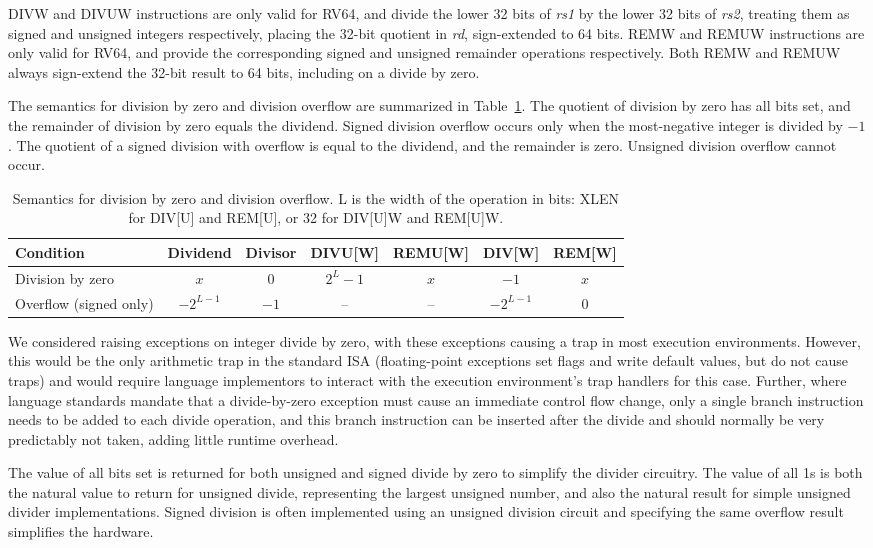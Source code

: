 DIVW and DIVUW instructions are only valid for RV64, and divide the
lower 32 bits of {\em rs1} by the lower 32 bits of {\em rs2}, treating
them as signed and unsigned integers respectively, placing the 32-bit
quotient in {\em rd}, sign-extended to 64 bits.  REMW and REMUW
instructions are only valid for RV64, and provide the corresponding
signed and unsigned remainder operations respectively. Both REMW and
REMUW always sign-extend the 32-bit result to 64 bits, including on a
divide by zero.

The semantics for division by zero and division overflow are summarized in
Table~\ref{tab:divby0}.  The quotient of division by zero has all bits set, and
the remainder of division by zero equals the dividend.  Signed division overflow
occurs only when the most-negative integer is divided by $-1$.  The quotient of
a signed division with overflow is equal to the dividend, and the remainder is
zero. Unsigned division overflow cannot occur.

\vspace{0.1in}
\begin{table}[h]
\center
\begin{tabular}{|l|c|c||c|c|c|c|}
\hline
Condition              & Dividend   & Divisor & DIVU[W]   & REMU[W] & DIV[W]     & REM[W] \\ \hline
Division by zero       & $x$        & 0       & $2^{L}-1$ & $x$     & $-1$       & $x$    \\
Overflow (signed only) & $-2^{L-1}$ & $-1$    & --        & --      & $-2^{L-1}$ & 0      \\
\hline
\end{tabular}
\caption{Semantics for division by zero and division overflow.
L is the width of the operation in bits: XLEN for DIV[U] and REM[U], or
32 for DIV[U]W and REM[U]W.}
\label{tab:divby0}
\end{table}

\begin{commentary}
We considered raising exceptions on integer divide by zero, with these
exceptions causing a trap in most execution environments.  However,
this would be the only arithmetic trap in the standard ISA
(floating-point exceptions set flags and write default values, but do
not cause traps) and would require language implementors to interact
with the execution environment's trap handlers for this case.
Further, where language standards mandate that a divide-by-zero
exception must cause an immediate control flow change, only a single
branch instruction needs to be added to each divide operation, and
this branch instruction can be inserted after the divide and should
normally be very predictably not taken, adding little runtime
overhead.

The value of all bits set is returned for both unsigned and signed
divide by zero to simplify the divider circuitry.  The value of all 1s
is both the natural value to return for unsigned divide, representing
the largest unsigned number, and also the natural result for simple
unsigned divider implementations.  Signed division is often
implemented using an unsigned division circuit and specifying the same
overflow result simplifies the hardware.
\end{commentary}
